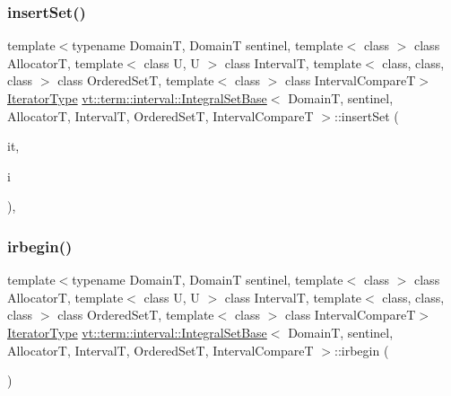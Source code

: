 \subsubsection{\texorpdfstring{insert\+Set()}{insertSet()}}
{\footnotesize\ttfamily template$<$typename DomainT, DomainT sentinel, template$<$ class $>$ class AllocatorT, template$<$ class U, U $>$ class IntervalT, template$<$ class, class, class $>$ class Ordered\+SetT, template$<$ class $>$ class Interval\+CompareT$>$ \\
\hyperlink{structvt_1_1term_1_1interval_1_1_integral_set_base_a111b2ec1ea960a40ba4270be702f11f1}{Iterator\+Type} \hyperlink{structvt_1_1term_1_1interval_1_1_integral_set_base}{vt\+::term\+::interval\+::\+Integral\+Set\+Base}$<$ DomainT, sentinel, AllocatorT, IntervalT, Ordered\+SetT, Interval\+CompareT $>$\+::insert\+Set (\begin{DoxyParamCaption}\item[{\hyperlink{structvt_1_1term_1_1interval_1_1_integral_set_base_a111b2ec1ea960a40ba4270be702f11f1}{Iterator\+Type}}]{it,  }\item[{\hyperlink{structvt_1_1term_1_1interval_1_1_integral_set_base_a1f8f5bb84064be35bbaaf15bb5a43f14}{Interval\+Type} \&\&}]{i }\end{DoxyParamCaption})\hspace{0.3cm}{\ttfamily [inline]}, {\ttfamily [private]}}

\mbox{\label{structvt_1_1term_1_1interval_1_1_integral_set_base_a07c43cee06c7e1f943f4acfd1274e8c1}} 
\subsubsection{\texorpdfstring{irbegin()}{irbegin()}}
{\footnotesize\ttfamily template$<$typename DomainT, DomainT sentinel, template$<$ class $>$ class AllocatorT, template$<$ class U, U $>$ class IntervalT, template$<$ class, class, class $>$ class Ordered\+SetT, template$<$ class $>$ class Interval\+CompareT$>$ \\
\hyperlink{structvt_1_1term_1_1interval_1_1_integral_set_base_a111b2ec1ea960a40ba4270be702f11f1}{Iterator\+Type} \hyperlink{structvt_1_1term_1_1interval_1_1_integral_set_base}{vt\+::term\+::interval\+::\+Integral\+Set\+Base}$<$ DomainT, sentinel, AllocatorT, IntervalT, Ordered\+SetT, Interval\+CompareT $>$\+::irbegin (\begin{DoxyParamCaption}{ }\end{DoxyParamCaption})\hspace{0.3cm}{\ttfamily [inline]}}

